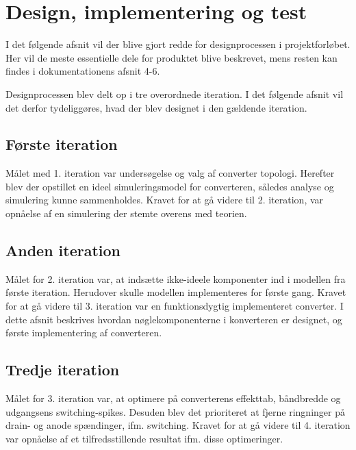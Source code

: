 \chapter{Design, implementering og test}
I det følgende afsnit vil der blive gjort redde for designprocessen i projektforløbet. Her vil de meste essentielle dele for produktet blive beskrevet, mens resten kan findes i dokumentationens afsnit 4-6.

Designprocessen blev delt op i tre overordnede iteration. I det følgende afsnit vil det derfor tydeliggøres, hvad der blev designet i den gældende iteration. 

\section{Første iteration}
Målet med 1. iteration var undersøgelse og valg af converter topologi. Herefter blev der opstillet en ideel simuleringsmodel for converteren, således analyse og simulering kunne sammenholdes. 
Kravet for at gå videre til 2. iteration, var opnåelse af en simulering der stemte overens med teorien. 




\section{Anden iteration}
Målet for 2. iteration var, at indsætte ikke-ideele komponenter ind i modellen fra første iteration. Herudover skulle modellen implementeres for første gang. 
Kravet for at gå videre til 3. iteration var en funktionsdygtig implementeret converter. 
I dette afsnit beskrives hvordan nøglekomponenterne i konverteren er designet, og første implementering af converteren.







\section{Tredje iteration}
Målet for 3. iteration var, at optimere på converterens effekttab, båndbredde og udgangsens switching-spikes. Desuden blev det prioriteret at fjerne ringninger på drain- og anode spændinger, ifm. switching.
Kravet for at gå videre til 4. iteration var opnåelse af et tilfredsstillende resultat ifm. disse optimeringer.


